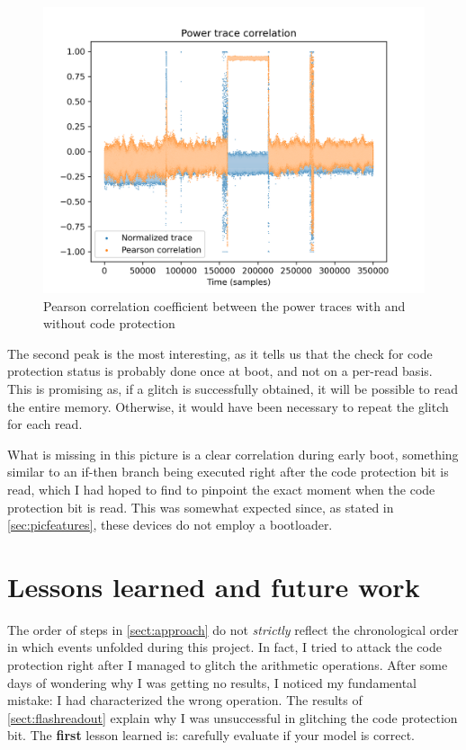 \documentclass[a4paper,english,twoside,10pt]{article}
\begin{document}
\begin{figure}[htbp]
	\centering%
	\includegraphics[width=.75\textwidth]{seaborn_trace_correlation.png}
	\caption{Pearson correlation coefficient between the power traces with and without code protection}
	\label{fig:trace_corr}
\end{figure}

The second peak is the most interesting, as it tells us that the check for code protection status is probably done once at boot, and not on a per-read basis. This is promising as, if a glitch is successfully obtained, it will be possible to read the entire memory. Otherwise, it would have been necessary to repeat the glitch for each read.

What is missing in this picture is a clear correlation during early boot, something similar to an if-then branch being executed right after the code protection bit is read, which I had hoped to find to pinpoint the exact moment when the code protection bit is read. This was somewhat expected since, as stated in \autoref{sec:picfeatures}, these devices do not employ a bootloader.

\section{Lessons learned and future work}
The order of steps in \autoref{sect:approach} do not \textit{strictly} reflect the chronological order in which events unfolded during this project. In fact, I tried to attack the code protection right after I managed to glitch the arithmetic operations. After some days of wondering why I was getting no results, I noticed my fundamental mistake: I had characterized the wrong operation. The results of \autoref{sect:flashreadout} explain why I was unsuccessful in glitching the code protection bit. The \textbf{first} lesson learned is: carefully evaluate if your model is correct.
\end{document}
